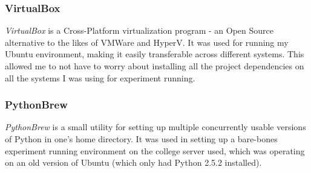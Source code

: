 \documentclass[a4paper,11pt]{report}
\begin{document}
\subsubsection*{VirtualBox}
\emph{VirtualBox} \citep{prog:virtualbox} is a Cross-Platform virtualization program - an Open Source alternative to the likes of VMWare and HyperV. It was used for running my Ubuntu environment, making it easily transferable across different systems. This allowed me to not have to worry about installing all the project dependencies on all the systems I was using for experiment running.

\subsubsection*{PythonBrew}
\emph{PythonBrew} \citep{prog:pythonbrew} is a small utility for setting up multiple concurrently usable versions of Python in one's home directory. It was used in setting up a bare-bones experiment running environment on the college server used, which was operating on an old version of Ubuntu (which only had Python 2.5.2 installed).



\end{document}
